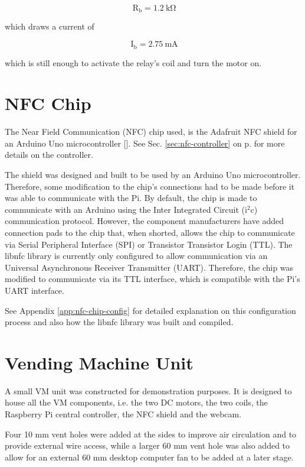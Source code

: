 \[\mathrm{\ R_{b}} = 1.2\mathrm{\ k\Omega}\]

which draws a current of 

\[\mathrm{\ I_{b}} = 2.75\mathrm{\ mA} \]

which is still enough to activate the relay's coil and turn the motor on. 

\section{NFC Chip}

The Near Field Communication (NFC) chip used, is the Adafruit NFC shield for an
Arduino Uno microcontroller [\cite{website:adafruit-nfc}]. See Sec.
\ref{sec:nfc-controller} on p.\pageref{sec:nfc-controller} for more details
on the controller.

The shield was designed and built to be used by an Arduino Uno microcontroller.
Therefore, some modification to the chip's connections had to be made before it
was able to communicate with the Pi. By default, the chip is made to communicate
with an Arduino using the Inter Integrated Circuit (i$^2$c) communication protocol. However, the
component manufacturers have added connection pads to the chip that, when shorted, allows
the chip to communicate via Serial Peripheral Interface (SPI) or Transistor
Transistor Login (TTL). The libnfc library is currently only configured to allow
communication via an Universal Asynchronous Receiver Transmitter (UART). Therefore, the
chip was modified to communicate via its TTL interface, which is compatible with the Pi's
UART interface. 

See Appendix \ref{app:nfc-chip-config} for detailed explanation on this
configuration process and also how the libnfc library was built and compiled. 

\section{Vending Machine Unit}

A small VM unit was constructed for demonstration purposes. It is
designed to house all the VM components, i.e. the two DC motors,
the two coils, the Raspberry Pi central controller, the NFC shield and the
webcam.

Four 10 mm vent holes were added at the sides to improve air circulation
and to provide external wire access, while a larger 60 mm vent hole was also
added to allow for an external 60 mm desktop computer fan to be added at a
later stage.

